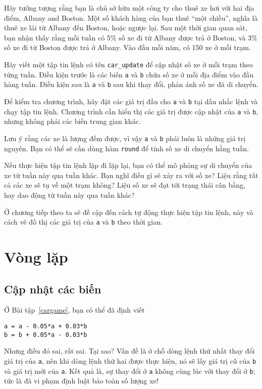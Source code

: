 \documentclass[12pt]{book}
\begin{document}
\begin{ex}
\label{cargame}

Hãy tưởng tượng rằng bạn là chủ sở hữu một công ty cho thuê xe hơi
với hai địa điểm, Albany and Boston. Một số khách hàng của bạn thuê
``một chiều'', nghĩa là thuê xe lái từ Albany đến Boston, hoặc 
ngược lại. Sau một thời gian quan sát, bạn nhận thấy rằng mỗi tuần
có 5\% số xe đi từ Albany được trả ở Boston, và 3\% số xe đi từ
Boston được trả ở Albany. Vào đầu mỗi năm, có 150 xe ở mỗi trạm.

Hãy viết một tập tin lệnh có tên \verb#car_update# để cập nhật số xe
ở mỗi trạm theo từng tuần. Điều kiện trước là các biến {\tt a} 
và {\tt b} chứa số xe ở mỗi địa điểm vào đầu hàng tuần. Điều kiện 
sau là {\tt a} và {\tt b} sau khi thay đổi, phản ánh số xe đã 
di chuyển.

Để kiểm tra chương trình, hãy đặt các giá trị đầu cho {\tt a} 
và {\tt b} tại dấu nhắc lệnh và chạy tập tin lệnh. Chương trình cần
hiển thị các giá trị được cập nhật của {\tt a} và {\tt b}, 
nhưng không phải các biến trung gian khác.

Lưu ý rằng các xe là lượng đếm được, vì vậy {\tt a} và 
{\tt b} phải luôn là những giá trị nguyên. Bạn có thể sẽ cần dùng 
hàm {\tt round} để tính số xe di chuyển hằng tuần.

Nếu thực hiện tập tin lệnh lặp đi lặp lại, bạn có thể mô phỏng sự
di chuyển của xe từ tuần này qua tuần khác. Bạn nghĩ điều gì sẽ
xảy ra với số xe? Liệu rằng tất cả các xe sẽ tụ về một trạm không?
Liệu số xe sẽ đạt tới trạng thái cân bằng, hay dao động từ tuần này
qua tuần khác?

Ở chương tiếp theo ta sẽ đề cập đến cách tự động thực hiện tập tin lệnh, 
này và cách vẽ đồ thị các giá trị của {\tt a} và {\tt b} 
theo thời gian.
\end{ex}



\chapter{Vòng lặp}

\section{Cập nhật các biến}

Ở Bài tập~\ref{cargame}, bạn có thể đã định viết

\begin{verbatim}
a = a - 0.05*a + 0.03*b
b = b + 0.05*a - 0.03*b
\end{verbatim}
%
Nhưng điều đó sai, rất sai. Tại sao? Vấn đề là ở chỗ dòng lệnh 
thứ nhất thay đổi giá trị của {\tt a}, nên khi dòng lệnh thứ hai 
được thực hiện, nó sẽ lấy giá trị cũ của {\tt b} và giá trị mới của
{\tt a}. Kết quả là, sự thay đổi ở {\tt a} không cùng lúc với thay
đổi ở {\tt b}; tức là đã vi phạm định luật bảo toàn số lượng xe!
\end{document}
